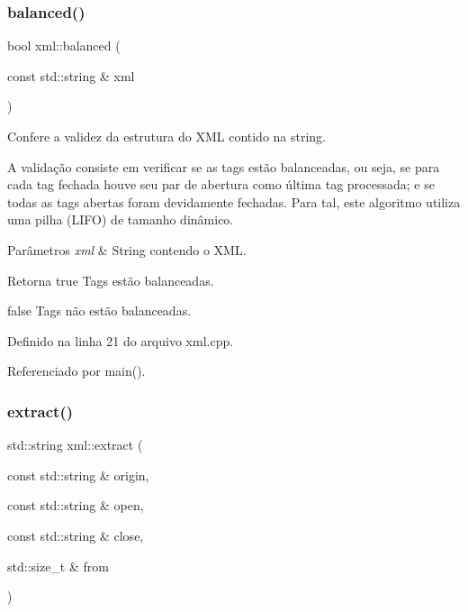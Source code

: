 \subsubsection{\texorpdfstring{balanced()}{balanced()}}
{\footnotesize\ttfamily bool xml\+::balanced (\begin{DoxyParamCaption}\item[{const std\+::string \&}]{xml }\end{DoxyParamCaption})}



Confere a validez da estrutura do X\+ML contido na string. 

A validação consiste em verificar se as tags estão balanceadas, ou seja, se para cada tag fechada houve seu par de abertura como última tag processada; e se todas as tags abertas foram devidamente fechadas. Para tal, este algoritmo utiliza uma pilha (L\+I\+FO) de tamanho dinâmico.


\begin{DoxyParams}{Parâmetros}
{\em xml} & String contendo o X\+ML. \\
\hline
\end{DoxyParams}
\begin{DoxyReturn}{Retorna}
true Tags estão balanceadas. 

false Tags não estão balanceadas. 
\end{DoxyReturn}


Definido na linha 21 do arquivo xml.\+cpp.



Referenciado por main().

\mbox{\label{namespacexml_a71783e2f9895997decf223259658b1d9}} 
\subsubsection{\texorpdfstring{extract()}{extract()}\hspace{0.1cm}{\footnotesize\ttfamily [1/2]}}
{\footnotesize\ttfamily std\+::string xml\+::extract (\begin{DoxyParamCaption}\item[{const std\+::string \&}]{origin,  }\item[{const std\+::string \&}]{open,  }\item[{const std\+::string \&}]{close,  }\item[{std\+::size\+\_\+t \&}]{from }\end{DoxyParamCaption})}



